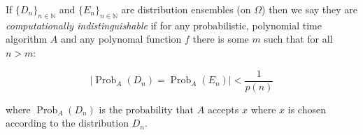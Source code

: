 \documentclass[12pt]{article}
\begin{document}
If $\{D_n\}_{n\in\mathbb{N}}$ and $\{E_n\}_{n\in\mathbb{N}}$ are distribution ensembles (on $\Omega$) then we say they are \emph{computationally indistinguishable} if for any probabilistic, polynomial time algorithm $A$ and any polynomal function $f$ there is some $m$ such that for all $n>m$:

$$|\operatorname{Prob}_A(D_n)=\operatorname{Prob}_A(E_n)|<\frac{1}{p(n)}$$

where $\operatorname{Prob}_A(D_n)$ is the probability that $A$ accepts $x$ where $x$ is chosen according to the distribution $D_n$.
\end{document}
